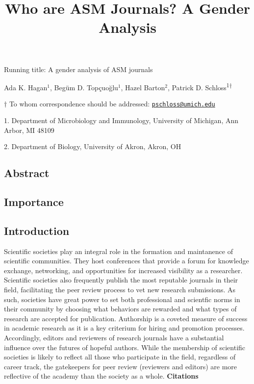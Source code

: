 \documentclass[11pt,]{article}
\title{\textbf{Who are ASM Journals? A Gender Analysis}}
\author{}
\date{}
\begin{document}
\maketitle

\vspace{35mm}

Running title: A gender analysis of ASM journals

\vspace{35mm}

Ada K. Hagan\({^1}\), Begüm D. Topçuoğlu\({^1}\), Hazel Barton\({^2}\),
Patrick D. Schloss\textsuperscript{1\(\dagger\)}

\vspace{40mm}

\(\dagger\) To whom correspondence should be addressed:
\href{mailto:pschloss@umich.edu}{\nolinkurl{pschloss@umich.edu}}

1. Department of Microbiology and Immunology, University of Michigan,
Ann Arbor, MI 48109

2. Department of Biology, University of Akron, Akron, OH

\newpage

\linenumbers

\subsection{Abstract}\label{abstract}

\subsection{Importance}\label{importance}

\subsection{Introduction}\label{introduction}

Scientific societies play an integral role in the formation and
maintanence of scientific communities. They host conferences that
provide a forum for knowledge exchange, networking, and opportunities
for increased visibility as a researcher. Scientific societies also
frequently publish the most reputable journals in their field,
facilitating the peer review process to vet new research submissions. As
such, societies have great power to set both professional and scientfic
norms in their community by choosing what behaviors are rewarded and
what types of research are accepted for publication. Authorship is a
coveted measure of success in academic research as it is a key criterium
for hiring and promotion processes. Accordingly, editors and reviewers
of research journals have a substantial influence over the futures of
hopeful authors. While the membership of scientific societies is likely
to reflect all those who participate in the field, regardless of career
track, the gatekeepers for peer review (reviewers and editors) are more
reflective of the academy than the society as a whole.
\textbf{Citations}
\end{document}
